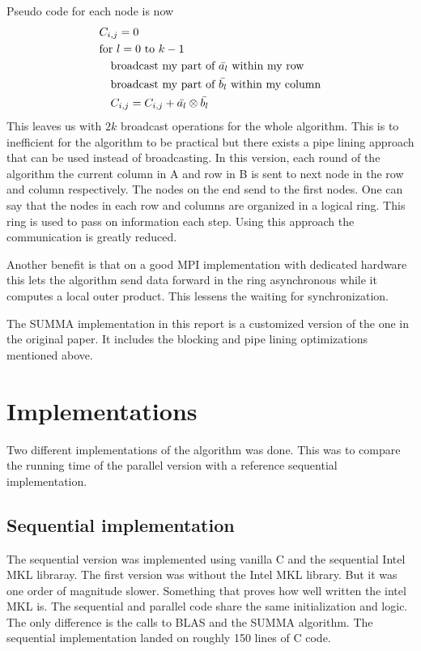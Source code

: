 \documentclass{article}
\begin{document}
Pseudo code for each node is now
\begin{align*}
  &C_{i,j} = 0\\
  &\text{for } l=0 \text{ to } k-1\\
  &\text{\enskip\enskip broadcast my part of } \bar{a_l} \text{ within my row}\\
  &\text{\enskip\enskip broadcast my part of } \bar{b_l} \text{ within my column}\\
  &\text{\enskip\enskip }C_{i,j} = C_{i,j} + \bar{a_l} \otimes \bar{b_l}\\
\end{align*}
This leaves us with $2k$ broadcast operations for the whole algorithm. This is to
inefficient for the algorithm to be practical but there exists a pipe lining approach
that can be used instead of broadcasting. In this version, each round of the algorithm
the current column in A and row in B is sent to next node in the row and column respectively.
The nodes on the end send to the first nodes. One can say that the nodes in each row and columns
are organized in a logical ring. This ring is used to pass on information each step. Using this
approach the communication is greatly reduced.

Another benefit is that on a good MPI implementation
with dedicated hardware this lets the algorithm send data forward in the ring asynchronous while
it computes a local outer product. This lessens the waiting for synchronization.

The SUMMA implementation in this report is a customized version of the one in the original paper\cite{summa}.
It includes the blocking and pipe lining optimizations mentioned above.

\section{Implementations}
Two different implementations of the algorithm was done.
This was to compare the running time of the parallel version with a reference
sequential implementation.

\subsection{Sequential implementation}
The sequential version was implemented using vanilla C and the sequential Intel MKL libraray. The first version
was without the Intel MKL library. But it was one order of magnitude slower. Something that proves how well written
the intel MKL is. The sequential and parallel code
share the same initialization and logic. The only difference is the calls to BLAS and the SUMMA algorithm.
The sequential implementation landed on roughly 150 lines of C code.
\end{document}
